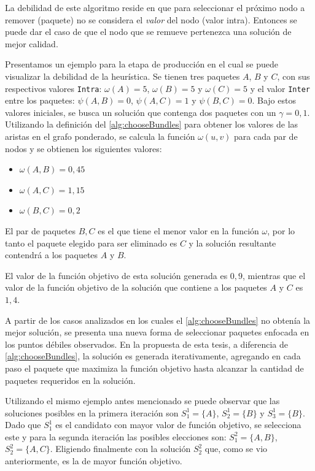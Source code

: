 La debilidad de este algoritmo reside en que para seleccionar el próximo nodo a remover (paquete) no se considera el \textit{valor} del nodo (valor intra). Entonces se puede dar el caso de que el nodo que se remueve pertenezca una solución de mejor calidad.

Presentamos un ejemplo para la etapa de producción en el cual se puede visualizar la debilidad de la heurística. Se tienen tres paquetes $A$, $B$ y $C$, con sus respectivos valores \texttt{Intra}: $\omega(A) = 5$, $\omega(B) = 5$ y $\omega(C) = 5$ y el valor \texttt{Inter} entre los paquetes: $\psi(A,B) = 0$, $\psi(A,C) = 1$ y $\psi(B,C) = 0$. Bajo estos valores iniciales, se busca un solución que contenga dos paquetes con un $\gamma=0,1$. Utilizando la definición del \autoref{alg:chooseBundles} para obtener los valores de las aristas en el grafo ponderado, se calcula la función $\omega(u,v)$ para cada par de nodos y se obtienen los siguientes valores:
\begin{itemize}
	\item $\omega(A,B) = 0,45$
	\item $\omega(A,C) = 1,15$
	\item $\omega(B,C) = 0,2$
\end{itemize}
 
El par de paquetes $B, C$ es el que tiene el menor valor en la función $\omega$, por lo tanto el paquete elegido para ser eliminado es $C$ y la solución resultante contendrá a los paquetes $A$ y $B$. 

El valor de la función objetivo de esta solución generada es $0,9$, mientras que el valor de la función objetivo de la solución que contiene a los paquetes $A$ y $C$ es $1,4$.

A partir de los casos analizados en los cuales el \autoref{alg:chooseBundles} no obtenía la mejor solución, se presenta una nueva forma de seleccionar paquetes enfocada en los puntos débiles observados. En la propuesta de esta tesis, a diferencia de \autoref{alg:chooseBundles}, la solución es generada iterativamente, agregando en cada paso el paquete que maximiza la función objetivo hasta alcanzar la cantidad de paquetes requeridos en la solución.

Utilizando el mismo ejemplo antes mencionado se puede observar que las soluciones posibles en la primera iteración son $S^{1}_{1}=\{A\}$, $S^{1}_{2}=\{B\}$ y $S^{1}_{3}=\{B\}$. Dado que $S^{1}_{1}$ es el candidato con mayor valor de función objetivo, se selecciona este y para la segunda iteración las posibles elecciones son:  $S^{2}_{1}=\{A,B\}$, $S^{2}_{2}=\{A,C\}$. Eligiendo finalmente con la solución $S^{2}_{2}$ que, como se vio anteriormente, es la de mayor función objetivo.

